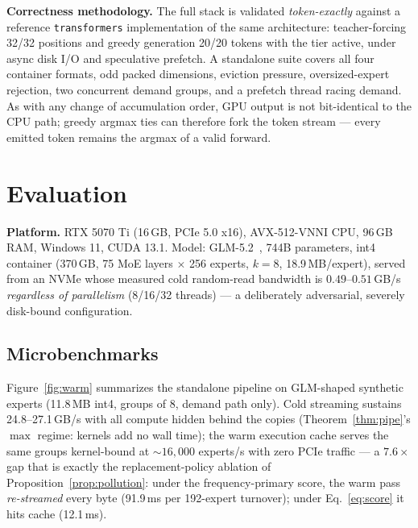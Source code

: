 \documentclass[11pt]{article}
\theoremstyle{definition}
\theoremstyle{remark}
\begin{document}
\textbf{Correctness methodology.} The full stack is validated
\emph{token-exactly} against a reference \texttt{transformers}
implementation of the same architecture: teacher-forcing 32/32 positions and
greedy generation 20/20 tokens with the tier active, under async disk I/O
and speculative prefetch. A standalone suite covers all four container
formats, odd packed dimensions, eviction pressure, oversized-expert
rejection, two concurrent demand groups, and a prefetch thread racing
demand. As with any change of accumulation order, GPU output is not
bit-identical to the CPU path; greedy argmax ties can therefore fork the
token stream --- every emitted token remains the argmax of a valid forward.

\section{Evaluation}\label{sec:eval}

\textbf{Platform.} RTX 5070 Ti (16\,GB, PCIe 5.0 x16), AVX-512-VNNI CPU,
96\,GB RAM, Windows 11, CUDA 13.1. Model: GLM-5.2~\citep{glm52report}, 744B
parameters, int4 container (370\,GB, 75 MoE layers $\times$ 256 experts,
$k{=}8$, 18.9\,MB/expert), served from an NVMe whose measured cold
random-read bandwidth is $0.49$--$0.51$\,GB/s \emph{regardless of parallelism}
(8/16/32 threads) --- a deliberately adversarial, severely disk-bound
configuration.

\subsection{Microbenchmarks}\label{sec:micro}
Figure~\ref{fig:warm} summarizes the standalone pipeline on GLM-shaped
synthetic experts (11.8\,MB int4, groups of 8, demand path only). Cold
streaming sustains 24.8--27.1\,GB/s with all compute hidden behind the
copies (Theorem~\ref{thm:pipe}'s $\max$ regime: kernels add no wall time);
the warm execution cache serves the same groups kernel-bound at
${\sim}16{,}000$ experts/s with zero PCIe traffic --- a $7.6\times$ gap that
is exactly the replacement-policy ablation of
Proposition~\ref{prop:pollution}: under the frequency-primary score, the
warm pass \emph{re-streamed} every byte (91.9\,ms per 192-expert turnover);
under Eq.~\eqref{eq:score} it hits cache (12.1\,ms).
\end{document}
